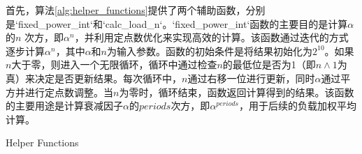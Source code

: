 首先，算法\ref{alg:helper_functions}提供了两个辅助函数，分别是`fixed\_power\_int`和`calc\_load\_n`。`fixed\_power\_int`函数的主要目的是计算\(\alpha\)的\(n\)    次方，即\(\alpha^n\)，并利用定点数优化来实现高效的计算。该函数通过迭代的方式逐步计算\(\alpha^n\)，其中\(\alpha\)和\(n\)为输入参数。函数的初始条件是将结果初始化为\(2^{10}\)。如果\(n\)大于零，则进入一个无限循环，循环中通过检查\(n\)的最低位是否为1（即\(n \land 1\)为真）来决定是否更新结果。每次循环中，\(n\)通过右移一位进行更新，同时\(\alpha\)通过平方并进行定点数调整。当\(n\)为零时，循环结束，函数返回计算得到的结果。该函数的主要用途是计算衰减因子\(\alpha\)的\(periods\)次方，即\(\alpha^{periods}\)，用于后续的负载加权平均计算。
\begin{algorithm}[h]
    \caption{Helper Functions}
    \label{alg:helper_functions}


    \BlankLine

\end{algorithm}

